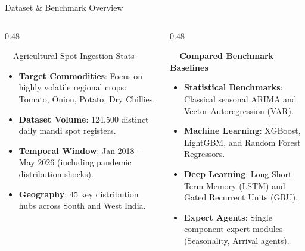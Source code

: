 \documentclass{beamer}
\begin{document}
\begin{frame}{Dataset \& Benchmark Overview}
\vspace{-0.2cm}

\begin{columns}[T]
    \begin{column}{0.48\textwidth}
        \begin{successcard}[height=5.2cm]{~~Agricultural Spot Ingestion Stats}
            \fontsize{6.8pt}{8.5pt}\selectfont
            \begin{itemize}\setlength\itemsep{3pt}\setlength\parskip{0pt}
                \item \textbf{Target Commodities}: Focus on highly volatile regional crops: Tomato, Onion, Potato, Dry Chillies.
                \item \textbf{Dataset Volume}: 124,500 distinct daily mandi spot registers.
                \item \textbf{Temporal Window}: Jan 2018 -- May 2026 (including pandemic distribution shocks).
                \item \textbf{Geography}: 45 key distribution hubs across South and West India.
            \end{itemize}
        \end{successcard}
    \end{column}
    
    \begin{column}{0.48\textwidth}
        \begin{smallcard}[0.98\textwidth, top=3pt, bottom=3pt, left=4pt, right=4pt, boxsep=0.5pt]
            \centering \textbf{\textcolor{primaryDark}{\small {}~~Compared Benchmark Baselines}}
            \vspace{0.08cm}
            \fontsize{6.8pt}{8.2pt}\selectfont
            \begin{itemize}\setlength\itemsep{3.5pt}\setlength\parskip{0pt}
                \item \textbf{Statistical Benchmarks}: Classical seasonal ARIMA and Vector Autoregression (VAR).
                \item \textbf{Machine Learning}: XGBoost, LightGBM, and Random Forest Regressors.
                \item \textbf{Deep Learning}: Long Short-Term Memory (LSTM) and Gated Recurrent Units (GRU).
                \item \textbf{Expert Agents}: Single component expert modules (Seasonality, Arrival agents).
            \end{itemize}
        \end{smallcard}
    \end{column}
\end{columns}


\end{frame}
\end{document}
